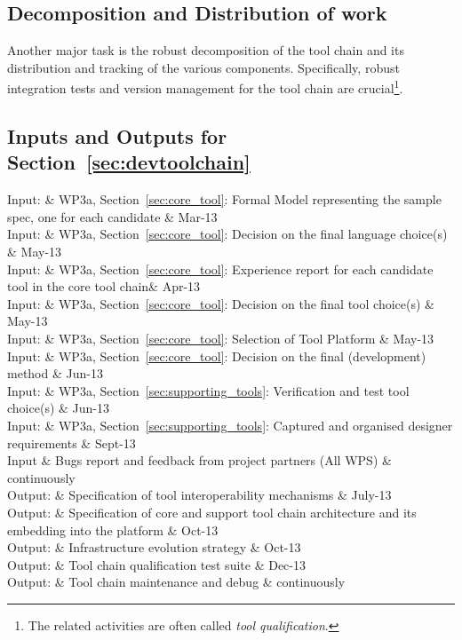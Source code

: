 \documentclass{template/openetcs_article}
\begin{document}
\subsection{Decomposition and Distribution of work}

Another major task is the robust decomposition of the tool chain and its 
distribution and tracking of the various components.  
Specifically, robust integration tests and version management for the tool chain are crucial\footnote{The related activities are often called {\it tool qualification}.}.



\subsection{Inputs and Outputs for Section~\ref{sec:devtoolchain}}


\begin{inoutput}
Input: & WP3a, Section~\ref{sec:core_tool}: Formal Model representing the sample
spec, one for each candidate  & Mar-13 \\
Input: & WP3a, Section~\ref{sec:core_tool}: Decision on the final language
choice(s) & May-13 \\
Input: & WP3a, Section~\ref{sec:core_tool}: Experience report for each candidate
tool in the core tool chain& Apr-13 \\
Input: & WP3a, Section~\ref{sec:core_tool}: Decision on the final tool choice(s)
& May-13 \\
Input: & WP3a, Section~\ref{sec:core_tool}: Selection of Tool Platform  & May-13 \\
Input: & WP3a, Section~\ref{sec:core_tool}: Decision on the final (development)
method  & Jun-13 \\
Input: & WP3a, Section~\ref{sec:supporting_tools}: Verification and test tool
choice(s)  & Jun-13 \\
Input: & WP3a, Section~\ref{sec:supporting_tools}: Captured and organised designer
requirements  & Sept-13 \\
Input & Bugs report and feedback from project partners (All WPS) 
& continuously\\
\hline
Output: & Specification of tool interoperability mechanisms & July-13 \\
Output: & Specification of core and support tool chain architecture and its
embedding into the platform & Oct-13 \\
Output: & Infrastructure evolution strategy & Oct-13 \\
Output: & Tool chain qualification test suite & Dec-13 \\
Output: & Tool chain maintenance and debug & continuously \\
\end{inoutput}
\end{document}
